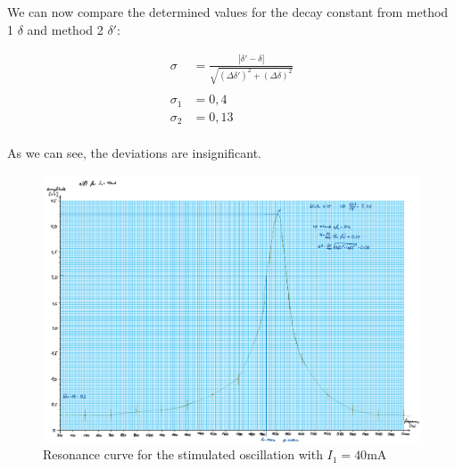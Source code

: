 \documentclass{article}
\begin{document}
\newpage

We can now compare the determined values for the decay constant from method 1 $\delta$ and method 2 $\delta'$:

\begin{equation}
    \begin{split}
        \sigma &= \frac{|\delta' - \delta|}{\sqrt{(\Delta \delta')^2+(\Delta \delta)^2}} \\ \\
        \sigma_1 &= 0,4 \\
        \sigma_2 &= 0,13 \\
    \end{split}
\end{equation}

As we can see, the deviations are insignificant.

\begin{figure} [p]
    \centering
    \includegraphics[height=\textwidth, angle=90]{graphics/13-dia3.pdf}
    \caption{Resonance curve for the stimulated oscillation with $I_1 = 40$mA}
    \label{fig:3}
\end{figure}
\end{document}
